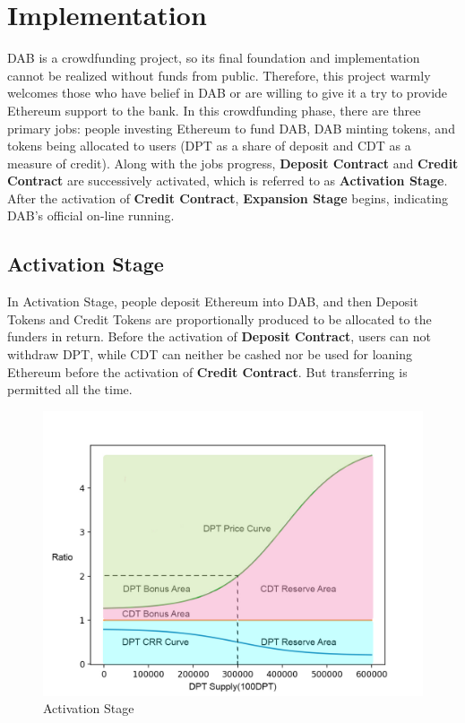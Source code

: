\documentclass[review]{elsarticle}
\begin{document}
\section{Implementation}
DAB is a crowdfunding project, so its final foundation and implementation cannot be realized without funds from public. Therefore, this project warmly welcomes those who have belief in DAB or are willing to give it a try to provide Ethereum support to the bank. 
In this crowdfunding phase, there are three primary jobs: people investing Ethereum to fund DAB, DAB minting tokens, and tokens being allocated to users (DPT as a share of deposit and CDT as a measure of credit). Along with the jobs progress, \textbf{Deposit Contract} and \textbf{Credit Contract} are successively activated, which is referred to as \textbf{Activation Stage}. After the activation of \textbf{Credit Contract}, \textbf{Expansion Stage} begins, indicating DAB's official on-line running.

\subsection{Activation Stage}
In Activation Stage, people deposit Ethereum into DAB, and then Deposit Tokens and Credit Tokens are proportionally produced to be allocated to the funders in return. Before the activation of \textbf{Deposit Contract}, users can not withdraw DPT, while CDT can neither be cashed nor be used for loaning Ethereum before the activation of \textbf{Credit Contract}. But transferring is permitted all the time.

\begin{figure}[H]
\begin{center}
\includegraphics[width=4.5in]{Graphs/Activation1.jpg}
\end{center}
\caption{Activation Stage}\label{AS}
\end{figure}
\end{document}
